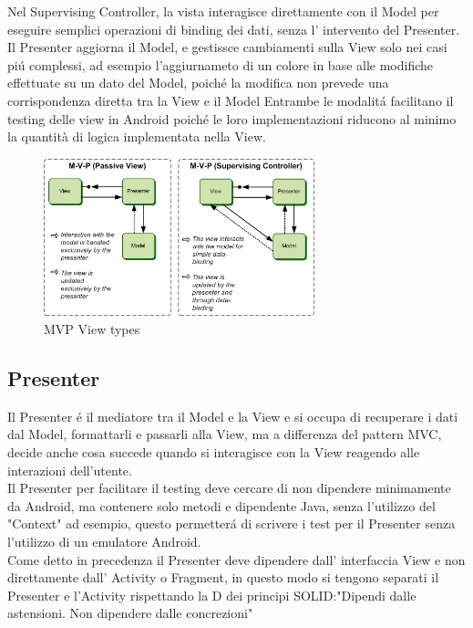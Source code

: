 Nel Supervising Controller, la vista interagisce direttamente con il Model per eseguire semplici operazioni di binding dei dati, senza l' intervento del Presenter. Il Presenter aggiorna il Model, e gestissce cambiamenti sulla View solo nei casi pi\'u complessi, ad esempio l'aggiurnameto di un colore in base alle modifiche effettuate su un dato del Model, poich\'e la modifica non prevede una corrispondenza diretta tra la View e il Model
Entrambe le modalit\'a facilitano il testing delle view in Android poich\'e le loro implementazioni riducono al minimo la quantità di logica implementata nella View.

\begin{figure}[!hb]
  \centering
  \includegraphics[width=0.7\textwidth]{immagini/mvp_view_types.png}
  \caption{MVP View types}\label{fig:Model View Types}
\end{figure}

\subsection{Presenter}
Il Presenter \'e il mediatore tra il Model e la View e si occupa di  recuperare i dati dal Model, formattarli e passarli alla View, ma a differenza del pattern MVC, decide anche cosa succede quando si interagisce con la View reagendo alle interazioni dell'utente.\\
Il Presenter per facilitare il testing deve cercare di non dipendere minimamente da Android, ma contenere solo metodi e dipendente Java, senza l'utilizzo del "Context" ad esempio, questo permetter\'a di scrivere i test per il Presenter senza l'utilizzo di un emulatore Android.\\
Come detto in precedenza  il Presenter deve dipendere dall' interfaccia View e non direttamente dall' Activity o Fragment, in questo modo si tengono separati il Presenter e l'Activity rispettando la D dei principi SOLID:"Dipendi dalle astensioni. Non dipendere dalle concrezioni"\\





\clearpage{\pagestyle{empty}\cleardoublepage}
